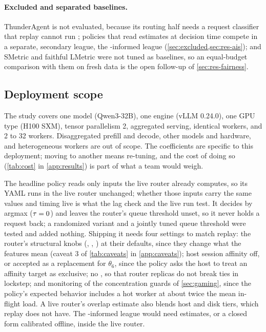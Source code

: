 \paragraph{Excluded and separated baselines.}
ThunderAgent is not evaluated, because its routing half needs a request classifier that replay
cannot run \citep{kang2026thunderagent}; policies that read \ais{} estimates at decision time compete
in a separate, secondary league, the \ais{}-informed league (\cref{sec:excluded,sec:res-ais}); and SMetric and faithful LMetric
were not tuned as baselines, so an equal-budget comparison with them on fresh data is the open
follow-up of \cref{sec:res-fairness}.

\subsection{Deployment scope}
\label{sec:threats-scope}

The study covers one model (Qwen3-32B), one engine (vLLM 0.24.0), one GPU type (H100 SXM),
tensor parallelism 2, aggregated serving, identical workers, and 2 to 32 workers. Disaggregated
prefill and decode, other models and hardware, and heterogeneous workers are out of scope. The
coefficients are specific to this deployment; moving to another means re-tuning, and the cost of
doing so (\cref{tab:cost} in \cref{app:results}) is part of what a team would weigh.

The headline policy reads only inputs the live router already computes, so its YAML runs in the
live router unchanged; whether those inputs carry the same values and timing live is what the lag
check and the live run test. It decides by argmax ($\tau = 0$) and leaves the router's queue
threshold unset, so it never holds a request back; a randomized variant and a jointly tuned queue
threshold were tested and added nothing. Shipping it needs four settings to match replay: the
router's structural knobs (, ,
) at their defaults, since they change what the features mean
(caveat 3 of \cref{tab:caveats} in \cref{app:caveats}); host session affinity off, or accepted as a replacement for
$\theta_6$, since the policy asks the host to treat an affinity target as exclusive; no ,
so that router replicas do not break ties in lockstep; and monitoring of the concentration guards
of \cref{sec:gaming}, since the policy's expected behavior includes a hot worker at about twice the
mean in-flight load. A live router's overlap estimate also blends host and disk tiers, which replay
does not have. The \ais{}-informed league would need \ais{} estimates, or a closed form
calibrated offline, inside the live router.
